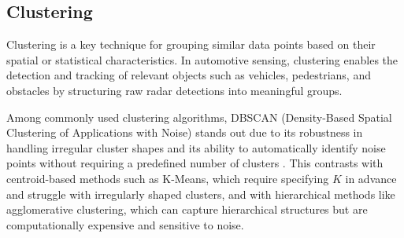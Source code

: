 
\vspace{1\baselineskip}
\subsection{Clustering}
Clustering is a key technique for grouping similar data points based on their spatial or statistical characteristics. 
In automotive sensing, clustering enables the detection and tracking of relevant objects such as vehicles, pedestrians, and obstacles by structuring raw radar detections into meaningful groups.

Among commonly used clustering algorithms, DBSCAN (Density-Based Spatial Clustering of Applications with Noise) stands out due to its robustness in handling irregular cluster shapes and its ability to automatically identify noise points without requiring a predefined number of clusters \cite{geeksforgeeks_dbscan}. 
This contrasts with centroid-based methods such as K-Means, which require specifying $K$ in advance and struggle with irregularly shaped clusters, and with hierarchical methods like agglomerative clustering, which can capture hierarchical structures but are computationally expensive and sensitive to noise.

